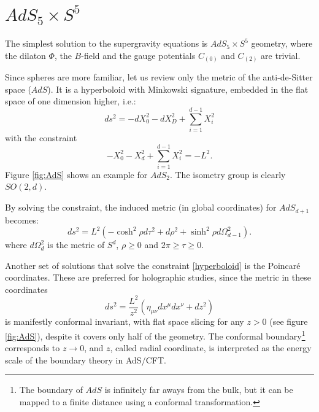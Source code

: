 \section{$AdS_5 \times S^5$}
The simplest solution to the supergravity equations is $AdS_5 \times S^5$ geometry,
where the dilaton $\Phi$, the $B$-field and the gauge potentials $C_{(0)}$ and $C_{(2)}$ are trivial.

Since spheres are more familiar, let us review only the metric of the anti-de-Sitter space ($AdS$).
It is a hyperboloid with Minkowski signature, embedded in the flat space of one dimension higher, i.e.:
\begin{equation}
 ds^2 = -dX_0^2-dX_D^2+\sum_{i=1}^{d-1} X_i^2
\end{equation}
with the constraint 
\begin{equation} \label{hyperboloid}
 - X_0^2 - X_d^2 + \sum_{i=1}^{d-1} X_i^2 = - L^2.
\end{equation}
Figure \ref{fig:AdS} shows an example for $AdS_2$.
The isometry group is clearly $SO(2,d)$.

By solving the constraint, the induced metric (in global coordinates) for $AdS_{d+1}$ becomes:
\begin{equation}
 ds^2 = L^2(-\cosh^2 \rho d\tau^2 + d\rho^2+\sinh^2\rho d\Omega_{d-1}^2).
\end{equation}
where $d\Omega_{d}^2$ is the metric of $S^d$, $\rho\geq 0$ and $2\pi \geq \tau \geq 0$.

Another set of solutions that solve the constraint \eqref{hyperboloid} is the Poincar\'e coordinates.
These are preferred for holographic studies, 
since the metric in these coordinates 
\begin{equation}\label{metricAdS}
 ds^2 = \dfrac{L^2}{z^2} (\eta_{\mu\nu} dx^\mu dx^\nu+dz^2 ) 
\end{equation}
is manifestly conformal invariant, with flat space slicing for any $z>0$ (see figure \ref{fig:AdS}), 
despite it covers only half of the geometry.
The conformal boundary\footnote{
The boundary of $AdS$ is infinitely far aways from the bulk,
but it can be mapped to a finite distance using a conformal transformation.} 
corresponds to $z \rightarrow 0$, 
and $z$, called radial coordinate, is interpreted as the energy scale of the boundary theory in AdS/CFT.


